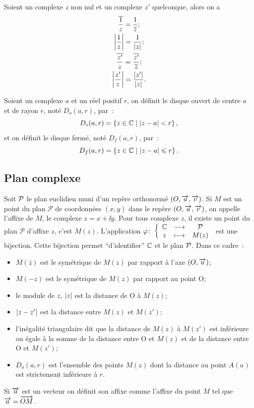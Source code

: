 %
\begin{prop}
  Soient un complexe \(z\) non nul et un complexe \(z'\) quelconque, alors on a
  \begin{gather}
    \bar{\frac{1}{z}}=\frac{1}{\bar{z}}; \\
    \abs{\frac{1}{z}}=\frac{1}{\abs{z}}; \\
    \bar{\frac{z'}{z}} = \frac{\bar{z'}}{\bar{z}};\\
    \abs{\frac{z'}{z}}=\frac{\abs{z'}}{\abs{z}}.
  \end{gather}
\end{prop}
%
\begin{defdef}
  Soient un complexe \(a\) et un réel positif \(r\), on définit le disque ouvert de centre \(a\) et de rayon \(r\), noté \(D_o(a,r)\), par~:
  \begin{equation}
    D_o(a,r)=\enstq{z\in\C}{\abs{z-a}<r},
  \end{equation}
  et on définit le disque fermé, noté \(D_f(a,r)\), par~:
  \begin{equation}
    D_f(a,r)=\enstq{z\in\C}{\abs{z-a}\leqslant r}.
  \end{equation}
\end{defdef}
%
\subsection{Plan complexe}
\label{subsec:plancomplexe}
%
Soit \(\P\) le plan euclidien muni d'un repère orthonormé \((O,\vect{u}, \vect{v})\). Si \(M\) est un point du plan \(\mathcal{P}\) de coordonnées \((x,y)\) dans le repère \((O,\vect{u}, \vect{v})\), on appelle l'affixe de \(M\), le complexe \(z=x + \ii y\). Pour tous complexe \(z\), il existe un point du plan \(\mathcal{P}\) d'affixe \(z\), c'est \(M(z)\). L'application \(\fonction{\varphi}{\C}{\P}{z}{M(z)}\) est une bijection. Cette bijection permet ``d'identifier'' \(\C\) et le plan \(\P\). Dans ce cadre~:
\begin{itemize}
\item \(M(\bar{z})\) est le symétrique de \(M(z)\) par rapport à l'axe \((O,\vect{u})\);
\item \(M(-z)\) est le symétrique de \(M(z)\) par rapport au point O;
\item le module de \(z\), \(\abs{z}\) est la distance de O à \(M(z)\);
\item \(\abs{z-z'}\) est la distance entre \(M(z)\) et \(M(z')\);
\item l'inégalité triangulaire dit que la distance de \(M(z)\) à \(M(z')\) est inférieure ou égale à la somme de la distance entre O et \(M(z)\) et de la distance entre O et \(M(z')\);
\item \(D_o(a,r)\) est l'ensemble des points \(M(z)\) dont la distance au point \(A(a)\) est strictement inférieure à \(r\).
\end{itemize}
Si \(\vect{a}\) est un vecteur on définit son affixe comme l'affixe du point \(M\) tel que \(\vect{a}=\vect{OM}\).

